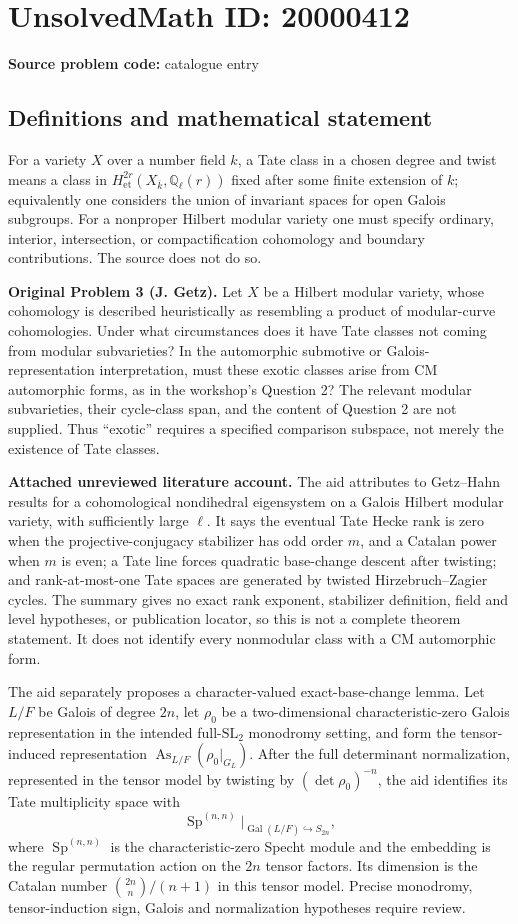 \documentclass[11pt]{article}
\newcommand{\Q}{\mathbb{Q}}
\begin{document}
\section*{UnsolvedMath ID: 20000412}
\textbf{Source problem code:} catalogue entry
\subsection{Definitions and mathematical statement}
For a variety $X$ over a number field $k$, a Tate class in a chosen degree and twist means a class in $H^{2r}_{\mathrm{et}}(X_{\overline k},\Q_\ell(r))$ fixed after some finite extension of $k$; equivalently one considers the union of invariant spaces for open Galois subgroups. For a nonproper Hilbert modular variety one must specify ordinary, interior, intersection, or compactification cohomology and boundary contributions. The source does not do so.

\textbf{Original Problem 3 (J. Getz).} Let $X$ be a Hilbert modular variety, whose cohomology is described heuristically as resembling a product of modular-curve cohomologies. Under what circumstances does it have Tate classes not coming from modular subvarieties? In the automorphic submotive or Galois-representation interpretation, must these exotic classes arise from CM automorphic forms, as in the workshop's Question 2? The relevant modular subvarieties, their cycle-class span, and the content of Question 2 are not supplied. Thus ``exotic'' requires a specified comparison subspace, not merely the existence of Tate classes.

\textbf{Attached unreviewed literature account.} The aid attributes to Getz--Hahn results for a cohomological nondihedral eigensystem on a Galois Hilbert modular variety, with sufficiently large $\ell$. It says the eventual Tate Hecke rank is zero when the projective-conjugacy stabilizer has odd order $m$, and a Catalan power when $m$ is even; a Tate line forces quadratic base-change descent after twisting; and rank-at-most-one Tate spaces are generated by twisted Hirzebruch--Zagier cycles. The summary gives no exact rank exponent, stabilizer definition, field and level hypotheses, or publication locator, so this is not a complete theorem statement. It does not identify every nonmodular class with a CM automorphic form.

The aid separately proposes a character-valued exact-base-change lemma. Let $L/F$ be Galois of degree $2n$, let $\rho_0$ be a two-dimensional characteristic-zero Galois representation in the intended full-$\mathrm{SL}_2$ monodromy setting, and form the tensor-induced representation $\operatorname{As}_{L/F}(\rho_0|_{G_L})$. After the full determinant normalization, represented in the tensor model by twisting by $(\det\rho_0)^{-n}$, the aid identifies its Tate multiplicity space with
\[\operatorname{Sp}^{(n,n)}\big|_{\operatorname{Gal}(L/F)\hookrightarrow S_{2n}},\]
where $\operatorname{Sp}^{(n,n)}$ is the characteristic-zero Specht module and the embedding is the regular permutation action on the $2n$ tensor factors. Its dimension is the Catalan number $\binom{2n}{n}/(n+1)$ in this tensor model. Precise monodromy, tensor-induction sign, Galois and normalization hypotheses require review.
\end{document}
